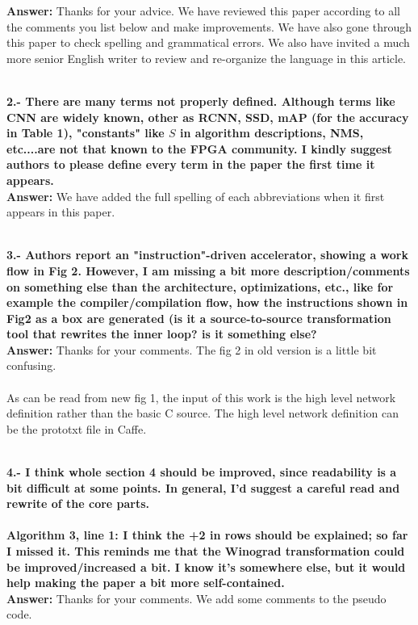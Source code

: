 \documentclass[12pt]{paper}
\newcommand{\rev}[1]{{{\color[rgb]{0,0,1}{#1}}}}
\newcommand{\answer}[1]{\noindent\textbf{Answer:} #1}
\newcommand{\comment}[1]{\noindent\textbf{\\ #1}\\}
\begin{document}
\answer{Thanks for your advice. We have reviewed this paper according to all the comments you list below and make improvements. We have also gone through this paper to check spelling and grammatical errors. We also have invited a much more senior English writer to review and re-organize the language in this article.}

\comment{2.- There are many terms not properly defined. Although terms like CNN are widely known, other as RCNN, SSD, mAP (for the accuracy in Table 1), "constants" like $S$ in algorithm descriptions, NMS, etc....are not that known to the FPGA community. I kindly suggest authors to please define every term in the paper the first time it appears.}

\answer{We have added the full spelling of each abbreviations when it first appears in this paper.
}
\rev{\\In Section 2, we have added the full spelling of RCNN, YOLO and SSD when they first appear. We have added a paragraph to introduce the evaluation of an image detection algorithm. The evaluating indicator is Mean Average Precision(mAP). In Section 4, the $S$ in the code stands for stride. To make it easier to understand, we set the $S$ to 1 in this article.
}

\comment{3.- Authors report an "instruction"-driven accelerator, showing a work flow in Fig 2. However, I am missing a bit more description/comments on something else than the architecture, optimizations, etc., like for example the compiler/compilation flow, how the instructions shown in Fig2 as a box are generated (is it a source-to-source transformation tool that rewrites the inner loop? is it something else? }

\answer{Thanks for your comments. The fig 2 in old version is a little bit confusing.\\
}
\rev{We have now replace the fig.2 in old version with the fig.1 in new version. Because the old fig 2 describes the workflow of this paper, we place the description of our workflow at the beginninng of this article(Section 1).}
{\\As can be read from new fig 1, the input of this work is the high level network definition rather than the  basic C source. The high level network definition can be the prototxt file in Caffe.
}

\comment{4.- I think whole section 4 should be improved, since readability is a bit difficult at some points. In general, I'd suggest a careful read and rewrite of the core parts. }
\comment{Algorithm 3, line 1: I think the +2 in rows should be explained; so far I missed it. This reminds me that the Winograd transformation could be improved/increased a bit. I know it's somewhere else, but it would help making the paper a bit more self-contained.  }

\answer{Thanks for your comments. We add some comments to the pseudo code. \\
}
\rev{We add comments in the Algorithm 3 to make the pseudo code easier to understand. In fact, the +2 in rows is resulted from Winograd transformation. At line 7, the +2 in col is also resulted from Winograd, and we add comment for line 7 similarity.}
\end{document}
